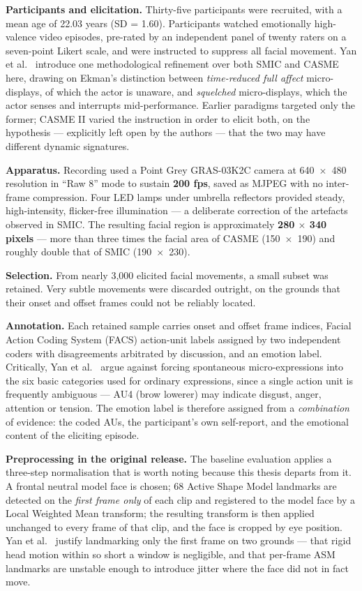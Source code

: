 \textbf{Participants and elicitation.} Thirty-five participants were recruited, with a mean age of 22.03 years (SD = 1.60). Participants watched emotionally high-valence video episodes, pre-rated by an independent panel of twenty raters on a seven-point Likert scale, and were instructed to suppress all facial movement. Yan et al.~\cite{yan2014} introduce one methodological refinement over both SMIC and CASME here, drawing on Ekman's distinction between \textit{time-reduced full affect} micro-displays, of which the actor is unaware, and \textit{squelched} micro-displays, which the actor senses and interrupts mid-performance. Earlier paradigms targeted only the former; CASME II varied the instruction in order to elicit both, on the hypothesis --- explicitly left open by the authors --- that the two may have different dynamic signatures.

\textbf{Apparatus.} Recording used a Point Grey GRAS-03K2C camera at 640~$\times$~480 resolution in ``Raw 8'' mode to sustain \textbf{200 fps}, saved as MJPEG with no inter-frame compression. Four LED lamps under umbrella reflectors provided steady, high-intensity, flicker-free illumination --- a deliberate correction of the artefacts observed in SMIC. The resulting facial region is approximately \textbf{280 $\times$ 340 pixels} --- more than three times the facial area of CASME (150~$\times$~190) and roughly double that of SMIC (190~$\times$~230).

\textbf{Selection.} From nearly 3,000 elicited facial movements, a small subset was retained. Very subtle movements were discarded outright, on the grounds that their onset and offset frames could not be reliably located.

\textbf{Annotation.} Each retained sample carries onset and offset frame indices, Facial Action Coding System (FACS) action-unit labels assigned by two independent coders with disagreements arbitrated by discussion, and an emotion label. Critically, Yan et al.~\cite{yan2014} argue against forcing spontaneous micro-expressions into the six basic categories used for ordinary expressions, since a single action unit is frequently ambiguous --- AU4 (brow lowerer) may indicate disgust, anger, attention or tension. The emotion label is therefore assigned from a \textit{combination} of evidence: the coded AUs, the participant's own self-report, and the emotional content of the eliciting episode.

\textbf{Preprocessing in the original release.} The baseline evaluation applies a three-step normalisation that is worth noting because this thesis departs from it. A frontal neutral model face is chosen; 68 Active Shape Model landmarks are detected on the \textit{first frame only} of each clip and registered to the model face by a Local Weighted Mean transform; the resulting transform is then applied unchanged to every frame of that clip, and the face is cropped by eye position. Yan et al.~\cite{yan2014} justify landmarking only the first frame on two grounds --- that rigid head motion within so short a window is negligible, and that per-frame ASM landmarks are unstable enough to introduce jitter where the face did not in fact move.

